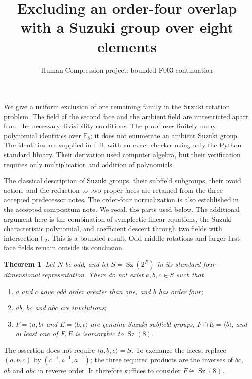 \documentclass[11pt,a4paper]{article}
\title{Excluding an order-four overlap with a Suzuki group over eight elements}
\author{Human Compression project: bounded F003 continuation}
\date{}
\newtheorem{theorem}{Theorem}
\newcommand{\Sz}{\operatorname{Sz}}
\newcommand{\F}{\mathbb F}
\begin{document}
\maketitle

We give a uniform exclusion of one remaining family in the Suzuki
rotation problem. The field of the second face and the ambient field
are unrestricted apart from the necessary divisibility conditions.
The proof uses finitely many polynomial identities over $\F_8$;
it does not enumerate an ambient Suzuki group. The identities are
supplied in full, with an exact checker using only the Python standard
library. Their derivation used computer algebra, but their verification
requires only multiplication and addition of polynomials.

The classical description of Suzuki groups, their subfield subgroups,
their ovoid action, and the reduction to two proper faces are retained
from the three accepted predecessor notes. The order-four normalization
is also established in the accepted compositum note. We recall the
parts used below. The additional argument here is the combination of
symplectic linear equations, the Suzuki characteristic polynomial, and
coefficient descent through two fields with intersection $\F_2$.
This is a bounded result. Odd middle rotations and larger first-face
fields remain outside its conclusion.

\begin{theorem}\label{main}
Let $N$ be odd, and let $S=\Sz(2^N)$ in its standard four-dimensional
representation. There do not exist $a,b,c\in S$ such that
\begin{enumerate}
\item $a$ and $c$ have odd order greater than one, and $b$ has order four;
\item $ab$, $bc$ and $abc$ are involutions;
\item $F=\langle a,b\rangle$ and $E=\langle b,c\rangle$ are genuine
Suzuki subfield groups, $F\cap E=\langle b\rangle$, and at least one
of $F,E$ is isomorphic to $\Sz(8)$.
\end{enumerate}
\end{theorem}

The assertion does not require $\langle a,b,c\rangle=S$. To exchange
the faces, replace $(a,b,c)$ by $(c^{-1},b^{-1},a^{-1})$; the three
required products are the inverses of $bc$, $ab$ and $abc$ in reverse
order. It therefore suffices to consider $F\cong\Sz(8)$.
\end{document}
